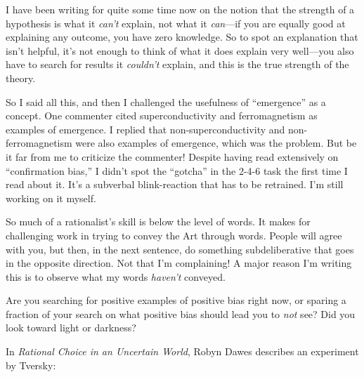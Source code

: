 {
 I have been writing for quite some time now on the notion that the
strength of a hypothesis is what it \textit{can't}
explain, not what it \textit{can}{}---if you are equally good at
explaining any outcome, you have zero knowledge. So to spot an
explanation that isn't helpful, it's
not enough to think of what it does explain very well---you also have
to search for results it \textit{couldn't} explain, and
this is the true strength of the theory.}

{
 So I said all this, and then I challenged the usefulness of
``emergence'' as a concept. One
commenter cited superconductivity and ferromagnetism as examples of
emergence. I replied that non-superconductivity and non-ferromagnetism
were also examples of emergence, which was the problem. But be it far
from me to criticize the commenter! Despite having read extensively on
``confirmation bias,'' I
didn't spot the
``gotcha'' in the 2-4-6 task the
first time I read about it. It's a subverbal
blink-reaction that has to be retrained. I'm still
working on it myself.}

{
 So much of a rationalist's skill is below the
level of words. It makes for challenging work in trying to convey the
Art through words. People will agree with you, but then, in the next
sentence, do something subdeliberative that goes in the opposite
direction. Not that I'm complaining! A major reason
I'm writing this is to observe what my words
\textit{haven't} conveyed.}

{
 Are you searching for positive examples of positive bias right
now, or sparing a fraction of your search on what positive bias should
lead you to \textit{not} see? Did you look toward light or darkness?}

\myendsectiontext


\bigskip


{
 In \textit{Rational Choice in an Uncertain World}, Robyn Dawes
describes an experiment by Tversky:\supercomma{}}

